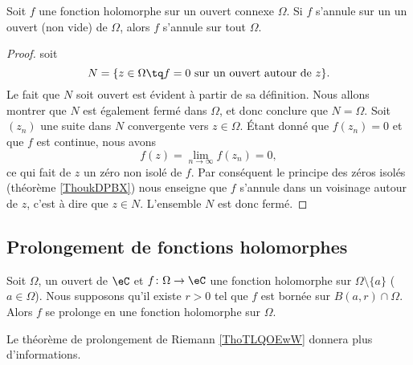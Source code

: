\begin{corollary}
    Soit \( f\) une fonction holomorphe sur un ouvert connexe \( \Omega\). Si \( f\) s'annule sur un un ouvert (non vide) de \( \Omega\), alors \( f\) s'annule sur tout \( \Omega\).
\end{corollary}

\begin{proof}
    soit 
    \begin{equation}
        N=\{ z\in \Omega\tq f=0\text{ sur un ouvert autour de $z$} \}.
    \end{equation}
    Le fait que \( N\) soit ouvert est évident à partir de sa définition. Nous allons montrer que \( N\) est également fermé dans \( \Omega\), et donc conclure que \( N=\Omega\). Soit \( (z_n)\) une suite dans \( N\) convergente vers \( z\in \Omega\). Étant donné que \( f(z_n)=0\) et que \( f\) est continue, nous avons
    \begin{equation}
        f(z)=\lim_{n\to \infty} f(z_n)=0,
    \end{equation}
    ce qui fait de \( z\) un zéro non isolé de \( f\). Par conséquent le principe des zéros isolés (théorème \ref{ThoukDPBX}) nous enseigne que \( f\) s'annule dans un voisinage autour de \( z\), c'est à dire que \( z\in N\). L'ensemble \( N\) est donc fermé.
\end{proof}

\subsection{Prolongement de fonctions holomorphes}

\begin{proposition} \label{PropDRnYkKP}
    Soit \( \Omega\), un ouvert de \( \eC\) et \( f\colon \Omega\to \eC\) une fonction holomorphe sur \( \Omega\setminus\{ a \}\) (\( a\in \Omega\)). Nous supposons qu'il existe \( r>0\) tel que \( f\) est bornée sur \( B(a,r)\cap\Omega\). Alors \( f\) se prolonge en une fonction holomorphe sur \( \Omega\).
\end{proposition}
Le théorème de prolongement de Riemann \ref{ThoTLQOEwW} donnera plus d'informations.

